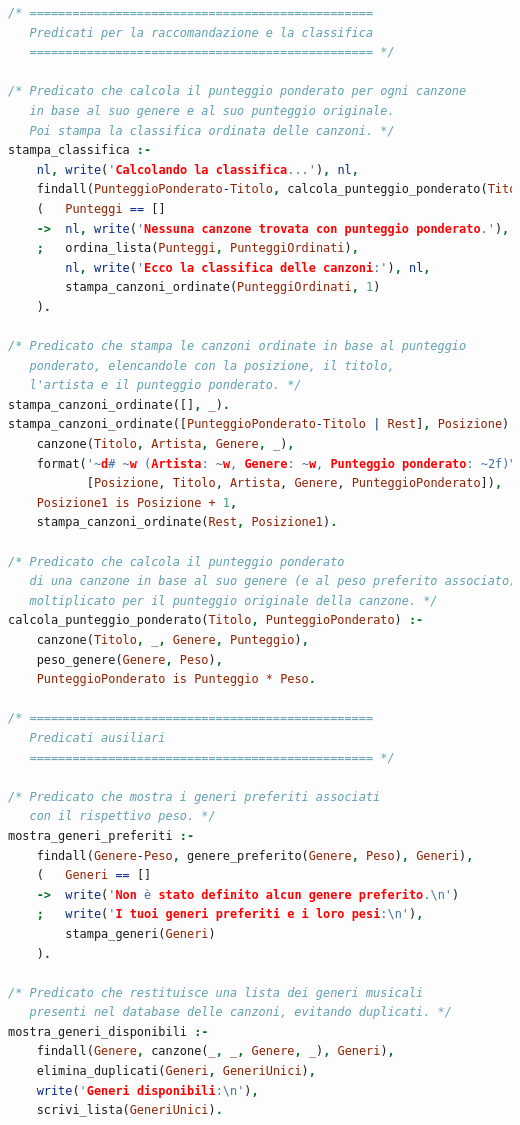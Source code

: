 \documentclass[a4paper,11pt]{article}
\begin{document}
\begin{lstlisting}[language=Prolog]
/* ================================================
   Predicati per la raccomandazione e la classifica
   ================================================ */

/* Predicato che calcola il punteggio ponderato per ogni canzone 
   in base al suo genere e al suo punteggio originale.
   Poi stampa la classifica ordinata delle canzoni. */
stampa_classifica :- 
    nl, write('Calcolando la classifica...'), nl,
    findall(PunteggioPonderato-Titolo, calcola_punteggio_ponderato(Titolo, PunteggioPonderato), Punteggi),
    (   Punteggi == []
    ->  nl, write('Nessuna canzone trovata con punteggio ponderato.'), nl
    ;   ordina_lista(Punteggi, PunteggiOrdinati),
        nl, write('Ecco la classifica delle canzoni:'), nl,
        stampa_canzoni_ordinate(PunteggiOrdinati, 1)
    ).

/* Predicato che stampa le canzoni ordinate in base al punteggio
   ponderato, elencandole con la posizione, il titolo,
   l'artista e il punteggio ponderato. */
stampa_canzoni_ordinate([], _).
stampa_canzoni_ordinate([PunteggioPonderato-Titolo | Rest], Posizione) :- 
    canzone(Titolo, Artista, Genere, _),
    format('~d# ~w (Artista: ~w, Genere: ~w, Punteggio ponderato: ~2f)\n', 
           [Posizione, Titolo, Artista, Genere, PunteggioPonderato]),
    Posizione1 is Posizione + 1,
    stampa_canzoni_ordinate(Rest, Posizione1).

/* Predicato che calcola il punteggio ponderato
   di una canzone in base al suo genere (e al peso preferito associato)
   moltiplicato per il punteggio originale della canzone. */
calcola_punteggio_ponderato(Titolo, PunteggioPonderato) :- 
    canzone(Titolo, _, Genere, Punteggio),
    peso_genere(Genere, Peso),
    PunteggioPonderato is Punteggio * Peso.

/* ================================================
   Predicati ausiliari
   ================================================ */

/* Predicato che mostra i generi preferiti associati
   con il rispettivo peso. */
mostra_generi_preferiti :- 
    findall(Genere-Peso, genere_preferito(Genere, Peso), Generi),
    (   Generi == []
    ->  write('Non è stato definito alcun genere preferito.\n')
    ;   write('I tuoi generi preferiti e i loro pesi:\n'),
        stampa_generi(Generi)
    ).

/* Predicato che restituisce una lista dei generi musicali 
   presenti nel database delle canzoni, evitando duplicati. */
mostra_generi_disponibili :- 
    findall(Genere, canzone(_, _, Genere, _), Generi),
    elimina_duplicati(Generi, GeneriUnici),
    write('Generi disponibili:\n'),
    scrivi_lista(GeneriUnici).


\end{lstlisting}
\end{document}
